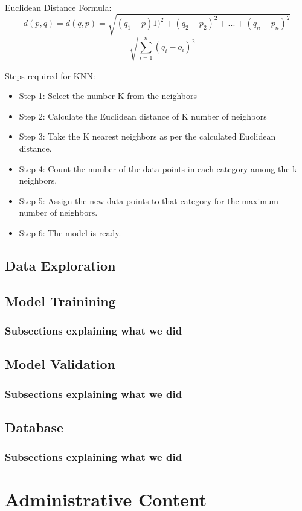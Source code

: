 \documentclass[a4paper,12pt]{report}
\begin{document}
Euclidean Distance Formula:
$$d(p,q)=d(q,p)=\sqrt{(q_1-p)1)^2+(q_2-p_2)^2+...+(q_n-p_n)^2}$$
$$=\sqrt{\sum_{i=1}^n(q_i-o_i)^2}$$

Steps required for KNN:
\vspace*{-.9cm}
\begin{itemize}[,]
    \setlength\itemsep{-.1cm}
    \item Step 1: Select the number K from the neighbors
    \item Step 2: Calculate the Euclidean distance of K number of neighbors
    \item Step 3: Take the K nearest neighbors as per the calculated Euclidean distance.
    \item Step 4: Count the number of the data points in each category among the k neighbors.
    \item Step 5: Assign the new data points to that category for the maximum number of neighbors.
    \item Step 6: The model is ready.
\end{itemize}


\section{Data Exploration}
\section{Model Trainining}
\subsection{Subsections explaining what we did}
\section{Model Validation}
\subsection{Subsections explaining what we did}
\section{Database}
\subsection{Subsections explaining what we did}

\chapter{Administrative Content}
\end{document}
